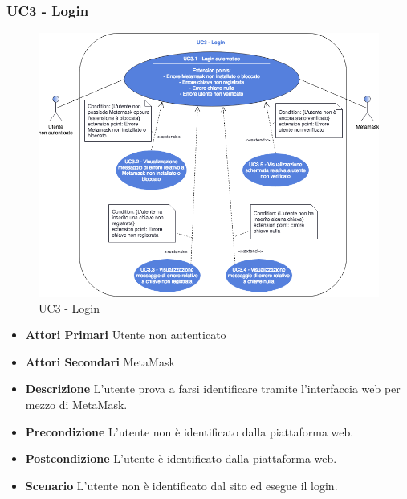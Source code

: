 \subsubsection{UC3 - Login}
\begin{figure}[h]
	\includegraphics[width=14.5cm]{res/images/UC3Login.png}
	\centering
	\caption{UC3 - Login}
	
\end{figure}
\begin{itemize}
	\item \textbf{Attori Primari}
	Utente non autenticato
	\item \textbf{Attori Secondari}
	MetaMask\glo
	\item \textbf{Descrizione}
	L'utente prova a farsi identificare tramite l'interfaccia web per mezzo di MetaMask\glo.
	\item \textbf{Precondizione}
	L'utente non è identificato dalla piattaforma web.
	\item \textbf{Postcondizione}
	L'utente è identificato dalla piattaforma web. 
	\item \textbf{Scenario}
	L'utente non è identificato dal sito ed esegue il login.
\end{itemize}
